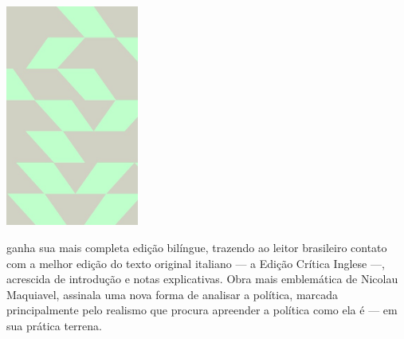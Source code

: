 \pagebreak

\hspace{.5cm}

\begin{center}
\hspace*{-.5cm}\includegraphics[width=43.7mm]{./imgs/maquiavel.jpeg}
\end{center}

\hspace*{-7cm}\hrulefill\hspace*{-7cm}

\medskip

 ganha sua mais completa edição bilíngue, trazendo ao leitor brasileiro contato com a melhor edição do texto original italiano --- a Edição Crítica Inglese ---, acrescida de introdução e notas explicativas. Obra mais emblemática de Nicolau Maquiavel, {} assinala uma nova forma de analisar a política, marcada principalmente pelo realismo que procura apreender a política como ela é --- em sua prática terrena.

\vfill

\hspace*{-.4cm}\begin{minipage}[c]{1\linewidth}
\small{
{}}
\end{minipage}

